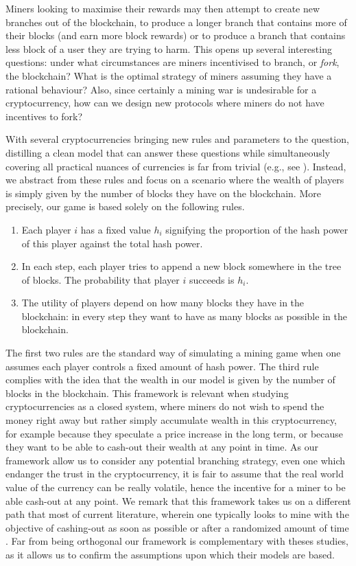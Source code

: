 Miners looking to maximise their rewards may then attempt to create new branches out of the blockchain, to produce a longer branch that contains more of their blocks (and earn more block rewards) or to produce a branch that contains less block of a user they are trying to harm. This opens up several interesting questions: under what circumstances are miners 
incentivised to branch, or \emph{fork}, the blockchain? What is the optimal strategy of miners assuming they have a rational behaviour? Also, since certainly a mining war is undesirable for a cryptocurrency, how can we design new protocols where miners do not have incentives to fork? 

With several cryptocurrencies bringing new rules and parameters to the question, distilling a clean model that can answer these questions while simultaneously covering 
all practical nuances of currencies is far from trivial (e.g., see \cite{mininggames:2016}). Instead, we abstract from these rules and focus on 
a scenario where the wealth of players is simply given by the number of blocks they have on the blockchain. More precisely, our game is based solely on the following rules. 
\begin{enumerate}
\item Each player $i$ has a fixed value $h_i$ signifying the proportion of the hash power of this player against the total hash power. 
\item In each step, each player tries to append a new block somewhere in the tree of blocks. The probability that player $i$ succeeds is $h_i$.
\item The utility of players depend on how many blocks they have in the blockchain: in every step they want to have as many blocks as possible in the blockchain.
\end{enumerate}
\noindent
The first two rules are the standard way of simulating a mining game when one assumes each player controls a fixed amount of hash power. The third rule complies with the idea that the wealth in our model is given by the number of blocks in the blockchain. This framework is relevant when studying cryptocurrencies as a closed system, where miners do not wish to spend the money right away but rather simply accumulate wealth in 
this cryptocurrency, for example because they speculate a price increase in the long term, or because they want to be able to cash-out their wealth at any point in time. As our framework allow us to consider any potential branching strategy, even one which endanger the trust in the cryptocurrency, it is fair to assume that the real world value of the currency can be really volatile, hence the incentive for a miner to be able cash-out at any point.
We remark that this framework takes us on a different path that most of current literature, wherein one typically looks to mine with the objective of cashing-out as soon as possible or after a randomized amount of time \cite{mininggames:2016,biais2018blockchain}. Far from being orthogonal our framework is complementary with theses studies, as it allows us to confirm the assumptions upon which their models are based. 

